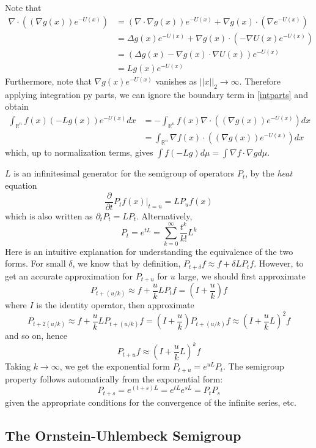 \documentclass[11pt]{article}
\begin{document}
Note that 
\begin{align*}
\nabla \cdot ((\nabla g(x)) e^{-U(x)}) 
&= (\nabla \cdot \nabla g(x))e^{-U(x)} + \nabla g(x) \cdot (\nabla
e^{-U(x)}) 
\\&= \Delta g(x) e^{-U(x)} + \nabla g(x) \cdot (-\nabla U(x)
e^{-U(x)})
\\&= (\Delta g(x) - \nabla g(x) \cdot \nabla U(x)) e^{-U(x)}
\\&= Lg(x) e^{-U(x)}
\end{align*}
Furthermore, note that $\nabla g(x) e^{-U(x)}$ vanishes as $||x||_2
\to \infty$.
Therefore applying integration py parts, we can ignore the boundary
term in \eqref{intparts} and obtain
\begin{align*}
\int_{\mathbb{R}^n} f(x) (-Lg(x)) e^{-U(x)} dx
&= -\int_{\mathbb{R}^n} f(x) \nabla\cdot ((\nabla g(x)) e^{-U(x)}) dx
\\&= \int_{\mathbb{R}^n} \nabla f(x) \cdot ((\nabla g(x)) e^{-U(x)}) dx
\end{align*}
which, up to normalization terms, gives $\int f(-Lg)d\mu = \int \nabla
f \cdot \nabla g d\mu$.

$L$ is an infinitesimal generator for the semigroup of operators
$P_t$, by the \emph{heat} equation
\[
\frac{\partial}{\partial t} P_t f(x) |_{t=u} = L P_u f(x)
\]
which is also written as $\partial_t P_t = L P_t$.
Alternatively,
\[
P_t = e^{tL} = \sum_{k=0}^\infty \frac{t^k}{k!} L^k
\]
Here is an intuitive explanation for understanding the equivalence of
the two forms.
For small $\delta$, we know that by definition, $P_{t+\delta} f
\approx f + \delta L P_t f$.
However, to get an accurate approximation for $P_{t+u}$ for $u$ large,
we should first approximate 
\[P_{t + (u/k)} \approx f + \frac{u}{k} LP_t
f = (I + \frac{u}{k}) f\]
where $I$ is the identity operator, then approximate
\[P_{t + 2(u/k)} \approx f + \frac{u}{k} L P_{t+(u/k)} f =
(I+\frac{u}{k}) P_{t + (u/k)} f \approx (I + \frac{u}{k}L)^2 f\]
and so on,
hence
\[
P_{t+u} f \approx (I + \frac{u}{k}L)^k f
\]
Taking $k \to \infty$, we get the
exponential form $P_{t+u} = e^{uL}P_t$.
The semigroup property follows automatically from the exponential form:
\[P_{t+s} = e^{(t+s)L} = e^{tL} e^{sL} = P_t P_s\]
given the appropriate conditions for the convergence of the infinite
series, etc.

\subsection{The Ornstein-Uhlembeck Semigroup}
\end{document}
